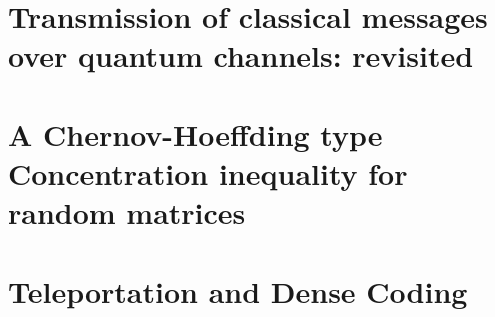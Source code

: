 \documentclass[a4paper, 11pt]{memoir}
\begin{document}
%  


\chapter{Transmission of classical messages over quantum channels: revisited}
\label{chap:channel_cod_rev}
 



%

\chapter{A Chernov-Hoeffding type Concentration inequality for random matrices}
\label{chap:hoeffding}
 



\chapter{Teleportation and Dense Coding}
\label{chap:telep_dense_cod}
 

\end{document}
